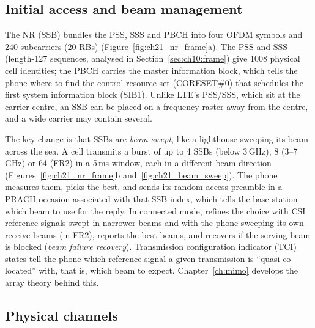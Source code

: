 
\subsection{Initial access and beam management}

The NR  (SSB) bundles the PSS, SSS and PBCH into four OFDM symbols and 240
subcarriers (20 RBs) (Figure~\ref{fig:ch21_nr_frame}a). The PSS and SSS (length-127 sequences,
analysed in Section~\ref{sec:ch10:frame}) give 1008 physical cell identities; the PBCH carries the
master information block, which tells the phone where to find the control resource set (CORESET\#0)
that schedules the first system information block (SIB1). Unlike LTE's PSS/SSS, which sit at the
carrier centre, an SSB can be placed on a frequency raster away from the centre, and a wide carrier
may contain several.

The key change is that SSBs are \emph{beam-swept}, like a lighthouse sweeping its beam across the
sea. A cell transmits a burst of up to 4 SSBs (below 3\,GHz), 8 (3--7\,GHz) or 64 (FR2) in a 5\,ms
window, each in a different beam direction (Figures~\ref{fig:ch21_nr_frame}b
and~\ref{fig:ch21_beam_sweep}). The phone measures them, picks the best, and sends its random access
preamble in a PRACH occasion associated with that SSB index, which tells the base station which beam
to use for the reply. In connected mode,  refines the choice with CSI reference
signals swept in narrower beams and with the phone sweeping its own receive beams (in FR2), reports
the best beams, and recovers if the serving beam is blocked (\emph{beam failure recovery}).
Transmission configuration indicator (TCI) states tell the phone which reference signal a given
transmission is ``quasi-co-located'' with, that is, which beam to expect. Chapter~\ref{ch:mimo}
develops the array theory behind this.

\subsection{Physical channels}

